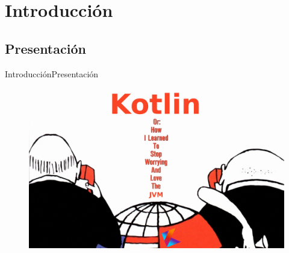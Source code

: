 \section{Introducción}


\subsection{Presentación}
\begin{frame}{Introducción}{Presentación}
  \begin{figure}[h]
  \centering
  \includegraphics[width=\textwidth]{images/introduction/cover}
  \end{figure}
\end{frame}

